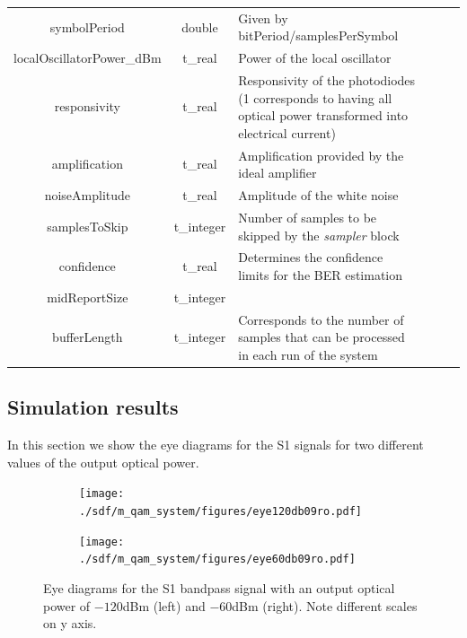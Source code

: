 \begin{table}[H]
\begin{tabular}{|c|c|p{70mm}|ccp{70mm}}
		symbolPeriod & double & Given by bitPeriod/samplesPerSymbol &    \\ \cline{1-3}
		localOscillatorPower\_dBm & t\_real & Power of the local oscillator &    \\ \cline{1-3}
		responsivity & t\_real & Responsivity of the photodiodes (1 corresponds to having all optical power transformed into electrical current) &    \\ \cline{1-3}
		amplification & t\_real & Amplification provided by the ideal amplifier &    \\ \cline{1-3}
		noiseAmplitude & t\_real & Amplitude of the white noise &    \\ \cline{1-3}
		samplesToSkip & t\_integer & Number of samples to be skipped by the \textit{sampler} block &    \\ \cline{1-3}
		confidence & t\_real & Determines the confidence limits for the BER estimation &    \\ \cline{1-3}
		midReportSize & t\_integer &  &    \\ \cline{1-3}
		bufferLength & t\_integer & Corresponds to the number of samples that can be processed in each run of the system &    \\ \cline{1-3}
		\end{tabular}
		\label{table:in_par}
		\end{table}

\subsection*{Simulation results}

In this section we show the eye diagrams for the S1 signals for two different values of the output optical power.

\begin{figure}[H]
	\centering
	\begin{subfigure}{.5\textwidth}
		\centering
		\texttt{[image: ./sdf/m\_qam\_system/figures/eye120db09ro.pdf]}
	\end{subfigure}%
	\begin{subfigure}{.5\textwidth}
		\centering
		\texttt{[image: ./sdf/m\_qam\_system/figures/eye60db09ro.pdf]}
	\end{subfigure}
	\caption{Eye diagrams for the S1 bandpass signal with an output optical power of $-120$dBm (left) and $-60$dBm (right). Note different scales on y axis.}
	\label{fig:test}
\end{figure}

